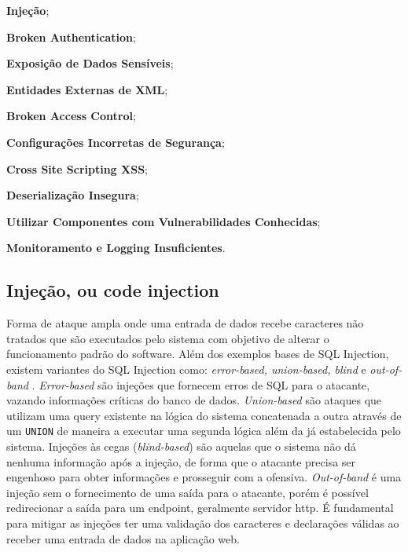 \begin{alineas}

\item \textbf{Injeção};
\item \textbf{Broken Authentication};
\item \textbf{Exposição de Dados Sensíveis};
\item \textbf{Entidades Externas de XML};
\item \textbf{Broken Access Control};
\item \textbf{Configurações Incorretas de Segurança};
\item \textbf{Cross Site Scripting XSS};
\item \textbf{Deserialização Insegura};
\item \textbf{Utilizar Componentes com Vulnerabilidades Conhecidas};
\item \textbf{Monitoramento e Logging Insuficientes}.


\end{alineas}

\bigskip

\subsection{Injeção, ou code injection}
Forma de ataque ampla onde uma entrada de dados recebe caracteres não tratados que são executados pelo sistema com objetivo de alterar o funcionamento padrão do software.
Além dos exemplos bases de SQL Injection, existem variantes do SQL Injection como: \textit{error-based, union-based, blind} e \textit{out-of-band} \cite{out_of_band_sql_invicti}. \textit{Error-based} são injeções que fornecem erros de SQL para o atacante, vazando informações críticas do banco de dados. \textit{Union-based} são ataques que utilizam uma query existente na lógica do sistema concatenada a outra através de um \verb+UNION+ de maneira a executar uma segunda lógica além da já estabelecida pelo sistema. Injeções às cegas (\textit{blind-based}) são aquelas que o sistema não dá nenhuma informação após a injeção, de forma que o atacante precisa ser engenhoso para obter informações e prosseguir com a ofensiva. \textit{Out-of-band} é uma injeção sem o fornecimento de uma saída para o atacante, porém é possível redirecionar a saída para um endpoint, geralmente servidor http.
É fundamental para mitigar as injeções ter uma validação dos caracteres e declarações válidas ao receber uma entrada de dados na aplicação web.

